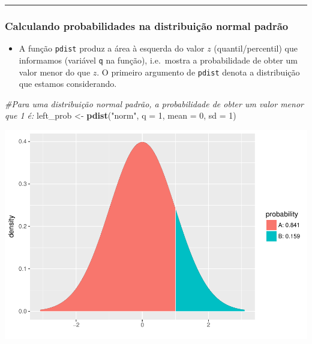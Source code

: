 \documentclass[]{article}
\newenvironment{Shaded}{\begin{snugshade}}{\end{snugshade}}
\newcommand{\KeywordTok}[1]{\textcolor[rgb]{0.13,0.29,0.53}{\textbf{#1}}}
\newcommand{\DataTypeTok}[1]{\textcolor[rgb]{0.13,0.29,0.53}{#1}}
\newcommand{\DecValTok}[1]{\textcolor[rgb]{0.00,0.00,0.81}{#1}}
\newcommand{\StringTok}[1]{\textcolor[rgb]{0.31,0.60,0.02}{#1}}
\newcommand{\CommentTok}[1]{\textcolor[rgb]{0.56,0.35,0.01}{\textit{#1}}}
\newcommand{\NormalTok}[1]{#1}
\providecommand{\tightlist}{%
  \setlength{\itemsep}{0pt}\setlength{\parskip}{0pt}}
\begin{document}
\begin{center}\rule{0.5\linewidth}{\linethickness}\end{center}

\subsubsection{Calculando probabilidades na distribuição normal
padrão}\label{calculando-probabilidades-na-distribuicao-normal-padrao}

\begin{itemize}
\tightlist
\item
  A função \texttt{pdist} produz a área à esquerda do valor \(z\)
  (quantil/percentil) que informamos (variável \texttt{q} na função),
  i.e.~mostra a probabilidade de obter um valor menor do que \(z\). O
  primeiro argumento de \texttt{pdist} denota a distribuição que estamos
  considerando.
\end{itemize}

\begin{Shaded}
\begin{Highlighting}[]
\CommentTok{#Para uma distribuição normal padrão, a probabilidade de obter um valor menor que 1 é:}
\NormalTok{left_prob <-}\StringTok{ }\KeywordTok{pdist}\NormalTok{(}\StringTok{"norm"}\NormalTok{, }\DataTypeTok{q =} \DecValTok{1}\NormalTok{, }\DataTypeTok{mean =} \DecValTok{0}\NormalTok{, }\DataTypeTok{sd =} \DecValTok{1}\NormalTok{)}
\end{Highlighting}
\end{Shaded}

\includegraphics{probability_files/figure-latex/unnamed-chunk-12-1.pdf}
\end{document}
